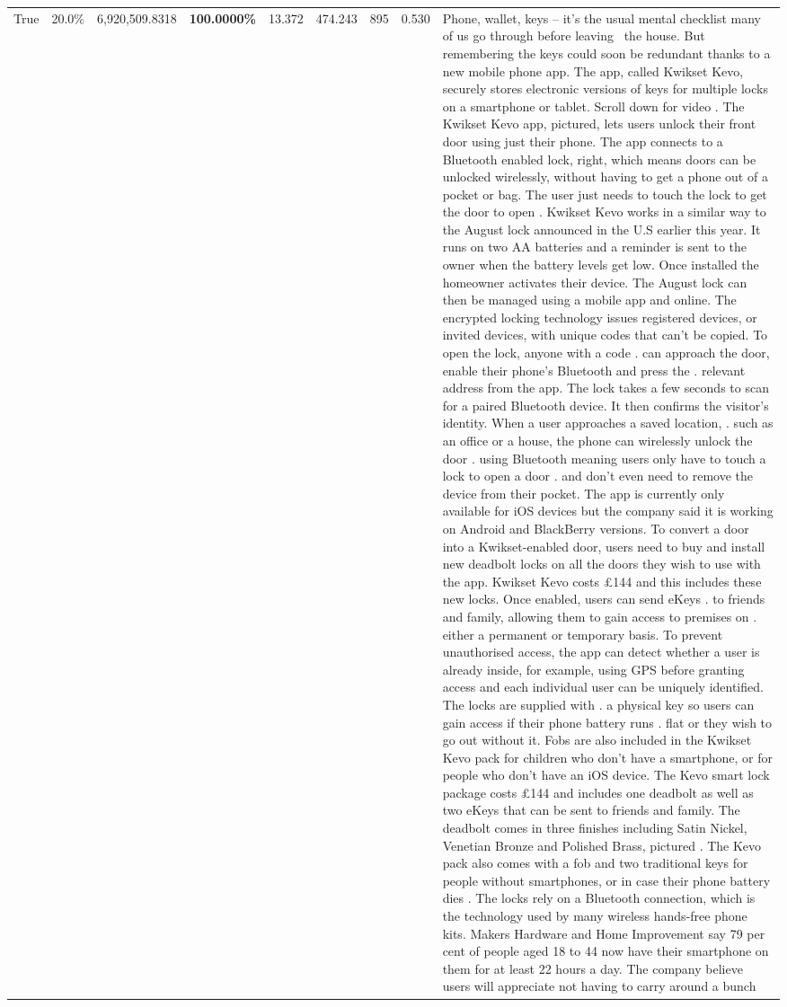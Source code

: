 \begin{table}[H]
\begin{tabular}{lllrlllll}
True & 20.0\% & 6,920,509.8318 & \bfseries \color{red} 100.0000\% & 13.372 & 474.243 & 895 & 0.530 & Phone, wallet, keys – it’s the usual mental checklist many of us go through before leaving  the house. But remembering the keys could soon be redundant thanks to a new mobile phone app. The app, called Kwikset Kevo, securely stores electronic versions of keys for multiple locks on a smartphone or tablet. Scroll down for video . The Kwikset Kevo app, pictured, lets users unlock their front door using just their phone. The app connects to a Bluetooth enabled lock, right, which means doors can be unlocked wirelessly, without having to get a phone out of a pocket or bag. The user just needs to touch the lock to get the door to open . Kwikset Kevo works in a similar way to the August lock announced in the U.S earlier this year. It runs on two AA batteries and a reminder is sent to the owner when the battery levels get low. Once installed the homeowner activates their device. The August lock can then be managed using a mobile app and online. The encrypted locking technology issues registered devices, or invited devices, with unique codes that can't be copied. To open the lock, anyone with a code . can approach the door, enable their phone's Bluetooth and press the . relevant address from the app. The lock takes a few seconds to scan for a paired Bluetooth device. It then confirms the visitor's identity. When a user approaches a saved location, . such as an office or a house, the phone can wirelessly unlock the door . using Bluetooth meaning users only have to touch a lock to open a door . and don't even need to remove the device from their pocket. The app is currently only available for iOS devices but the company said it is working on Android and BlackBerry versions. To convert a door into a Kwikset-enabled door, users need to buy and install new deadbolt locks on all the doors they wish to use with the app. Kwikset Kevo costs £144 and this includes these new locks. Once enabled, users can send eKeys . to friends and family, allowing them to gain access to premises on . either a permanent or temporary basis. To prevent unauthorised access, the app can detect whether a user is already inside, for example, using GPS before granting access and each individual user can be uniquely identified. The locks are supplied with . a physical key so users can gain access if their phone battery runs . flat or they wish to go out without it. Fobs are also included in the Kwikset Kevo pack for children who don't have a smartphone, or for people who don't have an iOS device. The Kevo smart lock package costs £144 and includes one deadbolt as well as two eKeys that can be sent to friends and family. The deadbolt comes in three finishes including Satin Nickel, Venetian Bronze and Polished Brass, pictured . The Kevo pack also comes with a fob and two traditional keys for people without smartphones, or in case their phone battery dies . The locks rely on a Bluetooth connection, which is the technology used by many wireless hands-free phone kits. Makers Hardware and Home Improvement say 79 per cent of people aged 18 to 44 now have their smartphone on them for at least 22 hours a day. The company believe users will appreciate not having to carry around a bunch 
\end{tabular}
\end{table}
